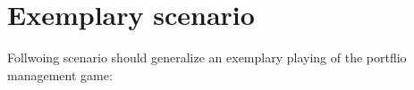 \section{Exemplary scenario}
Follwoing scenario should generalize an exemplary playing of the portflio management game:
